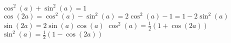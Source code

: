 \documentclass[12pt]{article}
\begin{document}
\begin{spacing}{0.8}
\begin{multicols*}{2}
\begin{flushleft}
\begin{outline}[longenum]
  \1 $\cos^2(a)+\sin^2(a)=1$
  \1 $\cos(2a)=\cos^2(a) - \sin^2(a) = 2\cos^2(a)-1 = 1-2\sin^2(a)$
  \1 $\sin(2a) = 2\sin(a)\cos(a)$
  \1 $\cos^2(a) = \frac{1}{2}(1 + \cos(2a))$
  \1 $\sin^2(a) = \frac{1}{2}(1 - \cos(2a))$


% 

\end{outline}
\end{flushleft}
\end{multicols*}
\end{spacing}
\end{document}
